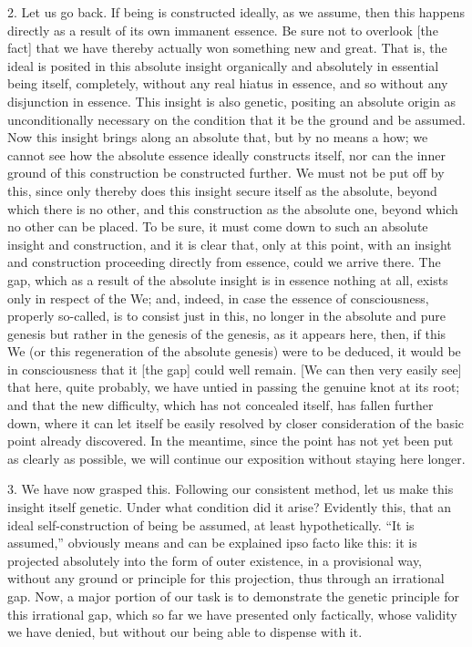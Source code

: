2. Let us go back.
If being is constructed ideally, as we assume,
then this happens directly as
a result of its own immanent essence.
Be sure not to overlook [the fact] that we have thereby
actually won something new and great.
That is, the ideal is posited in this absolute insight
organically and absolutely in essential being itself,
completely, without any real hiatus in essence,
and so without any disjunction in essence.
This insight is also genetic,
positing an absolute origin as unconditionally necessary
on the condition that it be the ground and be assumed.
Now this insight brings along an absolute that,
but by no means a how; we cannot see how
the absolute essence ideally constructs itself,
nor can the inner ground of this construction be constructed further.
We must not be put off by this,
since only thereby does
this insight secure itself as the absolute,
beyond which there is no other,
and this construction as the absolute one,
beyond which no other can be placed.
To be sure, it must come down to such
an absolute insight and construction,
and it is clear that, only at this point,
with an insight and construction proceeding
directly from essence, could we arrive there.
The gap, which as a result of
the absolute insight is in essence nothing at all,
exists only in respect of the We;
and, indeed, in case the essence of consciousness,
properly so-called, is to consist just in this,
no longer in the absolute and pure genesis
but rather in the genesis of the genesis, as it appears here,
then, if this We (or this regeneration of the absolute genesis)
were to be deduced, it would be in consciousness
that it [the gap] could well remain.
[We can then very easily see] that here, quite probably,
we have untied in passing the genuine knot at its root;
and that the new difficulty,
which has not concealed itself,
has fallen further down,
where it can let itself
be easily resolved by closer consideration
of the basic point already discovered.
In the meantime, since the point has
not yet been put as clearly as possible,
we will continue our exposition without staying here longer.

3. We have now grasped this.
Following our consistent method,
let us make this insight itself genetic.
Under what condition did it arise?
Evidently this, that an ideal
self-construction of being be assumed,
at least hypothetically.
“It is assumed,” obviously means and
can be explained ipso facto like this:
it is projected absolutely
into the form of outer existence,
in a provisional way,
without any ground or principle
for this projection,
thus through an irrational gap.
Now, a major portion of our task is
to demonstrate the genetic principle
for this irrational gap,
which so far we have presented only factically,
whose validity we have denied,
but without our being able to dispense with it.

